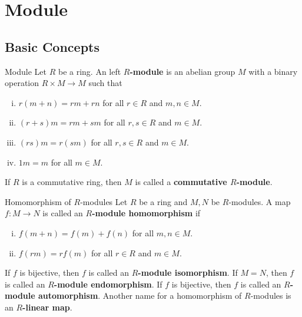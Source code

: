 

\chapter{Module}
\section{Basic Concepts}
\begin{definition}{Module}{}
    Let $R$ be a ring. An left \textbf{$R$-module} is an abelian group $M$ with a binary operation $R\times M\to M$ such that
    \begin{enumerate}[(i)]
        \item $r(m+n)=rm+rn$ for all $r\in R$ and $m, n\in M$.
        \item $(r+s)m=rm+sm$ for all $r, s\in R$ and $m\in M$.
        \item $(rs)m=r(sm)$ for all $r, s\in R$ and $m\in M$.
        \item $1m=m$ for all $m\in M$.
    \end{enumerate}
    If $R$ is a commutative ring, then $M$ is called a \textbf{commutative $R$-module}.
\end{definition}


\begin{definition}{Homomorphism of $R$-modules}{}
    Let $R$ be a ring and $M, N$ be $R$-modules. A map $f:M\to N$ is called an \textbf{$R$-module homomorphism} if
    \begin{enumerate}[(i)]
        \item $f(m+n)=f(m)+f(n)$ for all $m, n\in M$.
        \item $f(rm)=rf(m)$ for all $r\in R$ and $m\in M$.
    \end{enumerate}
    If $f$ is bijective, then $f$ is called an \textbf{$R$-module isomorphism}. If $M=N$, then $f$ is called an \textbf{$R$-module endomorphism}. If $f$ is bijective, then $f$ is called an \textbf{$R$-module automorphism}. Another name for a homomorphism of $R$-modules is an  \textbf{$R$-linear map}.
\end{definition}


